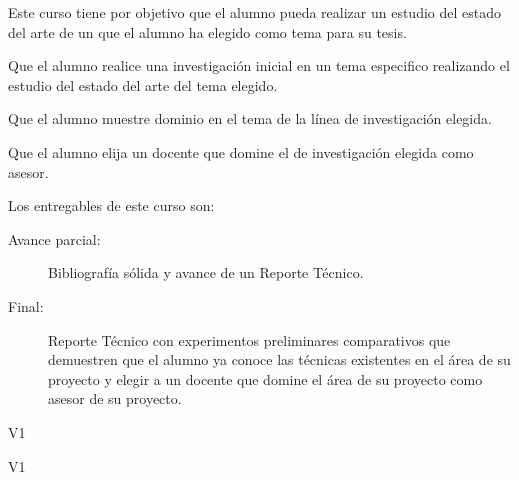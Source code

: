 \begin{syllabus}


\begin{justification}
Este curso tiene por objetivo que el alumno pueda realizar un estudio del estado del arte de un que el alumno ha elegido como tema para su tesis.
\end{justification}

\begin{goals}
\item Que el alumno realice una investigación inicial en un tema especifico realizando el estudio del estado del arte del tema elegido.
\item Que el alumno muestre dominio en el tema de la línea de investigación elegida.
\item Que el alumno elija un docente que domine el de investigación elegida como asesor. 
\item Los entregables de este curso son:
	\begin{description}
		\item [Avance parcial:] Bibliografía sólida y avance de un Reporte Técnico.
		\item [Final:] Reporte Técnico con experimentos preliminares comparativos que demuestren que el alumno ya conoce las técnicas existentes en el área de su proyecto y elegir a un docente que domine el área de su proyecto como asesor de su proyecto.
	\end{description}
\end{goals}

\begin{outcomes}{V1}
\item {}
\item {}
\item {}
\item {}
\item {}
\item {}
\item {}
\item {}
\end{outcomes}

\begin{competences}{V1}
\item {} 
\item {}
\item {}
\end{competences}


\end{syllabus}
